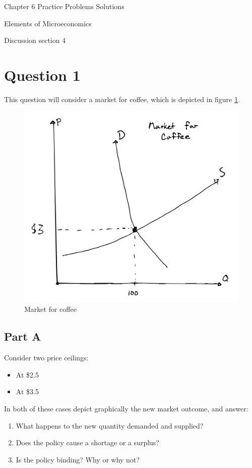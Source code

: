 \documentclass[12pt]{article}
\begin{document}
\begin{center}
\Large Chapter 6 Practice Problems Solutions

\medskip

\normalsize Elements of Microeconomics

\medskip

\small Discussion section 4
\end{center}

\medskip

\section*{Question 1}
This question will consider a market for coffee, which is depicted in figure \ref{fig:coffee_eq}.

\begin{figure}[h]
    \centering
    \includegraphics[width=.6\textwidth]{coffee_eq.png}
    \caption{Market for coffee}
    \label{fig:coffee_eq}
\end{figure}

\subsection*{Part A}
Consider two price ceilings:
    \begin{itemize}
        \item At \$2.5
        \item At \$3.5
    \end{itemize}

    \vspace{5mm}

    In both of these cases depict graphically the new market outcome, and answer:
    \begin{enumerate}
        \item What happens to the new quantity demanded and supplied?
        \item Does the policy cause a shortage or a surplus?
        \item Is the policy binding? Why or why not?
    \end{enumerate}
\end{document}
